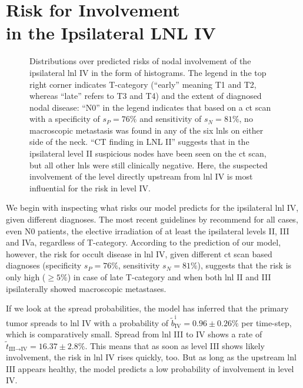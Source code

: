 \documentclass[\relativeRoot/main.tex]{subfiles}
\begin{document}
\section[Risk for Involvement in the Ipsilateral LNL IV]{Risk for Involvement\\in the Ipsilateral LNL IV}
\label{sec:complete:ipsi_IV}

\begin{figure}
    \centering
    \def\svgwidth{1.0\textwidth}
    
    \caption[]{
        Distributions over predicted risks of nodal involvement of the ipsilateral \gls{lnl} IV in the form of histograms. The legend in the top right corner indicates T-category (``early'' meaning T1 and T2, whereas ``late'' refers to T3 and T4) and the extent of diagnosed nodal disease: ``N0'' in the legend indicates that based on a \gls{ct} scan with a specificity of $s_P = 76\%$ and sensitivity of $s_N = 81\%$, no macroscopic metastasis was found in any of the six \glspl{lnl} on either side of the neck. ``CT finding in LNL II'' suggests that in the ipsilateral level II suspicious nodes have been seen on the \gls{ct} scan, but all other \glspl{lnl} were still clinically negative. Here, the suspected involvement of the level directly upstream from \gls{lnl} IV is most influential for the risk in level IV.
    }
\end{figure}

We begin with inspecting what risks our model predicts for the ipsilateral \gls{lnl} IV, given different diagnoses. The most recent guidelines by  recommend for all cases, even N0 patients, the elective irradiation of at least the ipsilateral levels II, III and IVa, regardless of T-category. According to the prediction of our model, however, the risk for occult disease in \gls{lnl} IV, given different \gls{ct} scan based diagnoses (specificity $s_P = 76\%$, sensitivity $s_N = 81\%$), suggests that the risk is only high ($\geq 5\%$) in case of late T-category and when both \gls{lnl} II and III ipsilaterally showed macroscopic metastases.

If we look at the spread probabilities, the model has inferred that the primary tumor spreads to \gls{lnl} IV with a probability of $\tilde{b}_\text{IV}^\text{i} = 0.96 \pm 0.26 \%$ per time-step, which is comparatively small. Spread from \gls{lnl} III to IV shows a rate of $\tilde{t}_{\text{III}\rightarrow\text{IV}} = 16.37 \pm 2.8 \%$. This means that as soon as level III shows likely involvement, the risk in \gls{lnl} IV rises quickly, too. But as long as the upstream \gls{lnl} III appears healthy, the model predicts a low probability of involvement in level IV.
\end{document}

